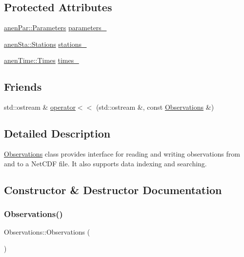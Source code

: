 \subsection*{Protected Attributes}
\begin{DoxyCompactItemize}
\item 
\mbox{\hyperlink{classanen_par_1_1_parameters}{anen\+Par\+::\+Parameters}} \mbox{\hyperlink{class_observations_a9e80eaaa9c096dda1dbbe8fcf631c087}{parameters\+\_\+}}
\item 
\mbox{\hyperlink{classanen_sta_1_1_stations}{anen\+Sta\+::\+Stations}} \mbox{\hyperlink{class_observations_a03e2d3c69e46066f48e4381657a995f7}{stations\+\_\+}}
\item 
\mbox{\hyperlink{classanen_time_1_1_times}{anen\+Time\+::\+Times}} \mbox{\hyperlink{class_observations_ad379be63239b03e0db53dc31014a2d74}{times\+\_\+}}
\end{DoxyCompactItemize}
\subsection*{Friends}
\begin{DoxyCompactItemize}
\item 
std\+::ostream \& \mbox{\hyperlink{class_observations_ad93ae2b52ac4bae27e3419d1545ee68f}{operator$<$$<$}} (std\+::ostream \&, const \mbox{\hyperlink{class_observations}{Observations}} \&)
\end{DoxyCompactItemize}


\subsection{Detailed Description}
\mbox{\hyperlink{class_observations}{Observations}} class provides interface for reading and writing observations from and to a Net\+C\+DF file. It also supports data indexing and searching. 

\subsection{Constructor \& Destructor Documentation}
\mbox{\label{class_observations_a80e66bee67e5e5eb41aa60b6d6f71544}} 
\subsubsection{\texorpdfstring{Observations()}{Observations()}\hspace{0.1cm}{\footnotesize\ttfamily [1/3]}}
{\footnotesize\ttfamily Observations\+::\+Observations (\begin{DoxyParamCaption}{ }\end{DoxyParamCaption})}

